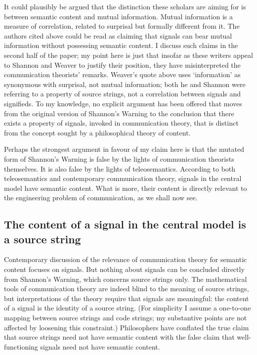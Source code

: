 \documentclass[12pt]{article}
\begin{document}
It could plausibly be argued that the distinction these scholars are aiming for is between semantic content and mutual information.
Mutual information is a measure of correlation, related to surprisal but formally different from it.
The authors cited above could be read as claiming that signals can bear mutual information without possessing semantic content.
I discuss such claims in the second half of the paper; my point here is just that insofar as these writers appeal to Shannon and Weaver to justify their position, they have misinterpreted the communication theorists' remarks.
Weaver's quote above uses `information' as synonymous with surprisal, not mutual information; both he and Shannon were referring to a property of source strings, not a correlation between signals and signifieds.
To my knowledge, no explicit argument has been offered that moves from the original version of {\sc Shannon's Warning} to the conclusion that there exists a property of signals, invoked in communication theory, that is distinct from the concept sought by a philosophical theory of content.

Perhaps the strongest argument in favour of my claim here is that the mutated form of {\sc Shannon's Warning} is false by the lights of communication theorists themselves.
It is also false by the lights of teleosemantics.
According to both teleosemantics and contemporary communication theory, signals in the central model have semantic content.
What is more, their content is directly relevant to the engineering problem of communication, as we shall now see.


\subsection{The content of a signal in the central model is a source string}\label{subsec:signalContent}

Contemporary discussion of the relevance of communication theory for semantic content focuses on signals.
But nothing about signals can be concluded directly from {\sc Shannon's Warning}, which concerns source strings only.
The mathematical tools of communication theory are indeed blind to the meaning of source strings, but interpretations of the theory require that signals are meaningful: the content of a signal is the identity of a source string.
(For simplicity I assume a one-to-one mapping between source strings and code strings; my substantive points are not affected by loosening this constraint.)
Philosophers have conflated the true claim that source strings need not have semantic content with the false claim that well-functioning signals need not have semantic content.
\end{document}
